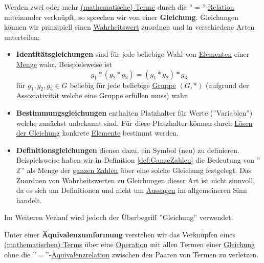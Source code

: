 \documentclass[../../main.tex]{subfiles}
\begin{document}
	\begin{definition}
		\label{def:Gleichung}
		Werden zwei oder mehr \hyperref[def:MathematischerTerm]{(mathematische) Terme} durch die ''$=$''-\hyperref[def:Relation]{Relation} miteinander verknüpft, so sprechen wir von einer \textbf{Gleichung}. Gleichungen können wir prinzipiell einen \hyperref[def:Wahrheitswert]{Wahrheitswert} zuordnen und in verschiedene Arten unterteilen:
		\begin{itemize}
			\item \textbf{Identitätsgleichungen} sind für jede beliebige Wahl von \hyperref[def:Element]{Elementen} einer \hyperref[def:Menge]{Menge} wahr. Beispielsweise ist 
			$$
			g_1 * (g_2 * g_3) = (g_1 * g_2) * g_3
			$$
			für $g_1,g_2,g_3 \in G$ beliebig für jede beliebige \hyperref[def:Gruppe]{Gruppe} $(G,*)$ (aufgrund der \hyperref[def:assoziativ]{Assoziativität} welche eine Gruppe erfüllen muss) wahr.

			\item \textbf{Bestimmungsgleichungen} enthalten Platzhalter für Werte (''Variablen'') welche zunächst unbekannt sind. Für diese Platzhalter können durch \hyperref[def:LösenEinerGleichung]{Lösen der Gleichung} konkrete \hyperref[def:Element]{Elemente} bestimmt werden.
			
			\item \textbf{Definitionsgleichungen} dienen dazu, ein Symbol (neu) zu definieren. Beispielsweise haben wir in Definition \ref{def:GanzeZahlen} die Bedeutung von ''$\mathbb{Z}$'' als Menge der \hyperref[def:GanzeZahlen]{ganzen Zahlen} über eine solche Gleichung festgelegt. Das Zuordnen von Wahrheitswerten zu Gleichungen dieser Art ist nicht sinnvoll, da es sich um Definitionen und nicht um \hyperref[def:Aussage]{Aussagen} im allgemeineren Sinn handelt.
 		\end{itemize}
 		Im Weiteren Verlauf wird jedoch der Überbegriff ''Gleichung'' verwendet. 
	\end{definition}

	\begin{definition}[Äquivalenzumformung]
		\label{def:Äquivalenzumformung}
		Unter einer \textbf{Äquivalenzumformung} verstehen wir das Verknüpfen eines \hyperref[def:MathematischerTerm]{(mathematischen) Terms} über eine \hyperref[def:Operation]{Operation} mit allen Termen einer \hyperref[def:Gleichung]{Gleichung} ohne die ''$=$''-\hyperref[def:Äquivalenzrelation]{Äquivalenzrelation} zwischen den Paaren von Termen zu verletzen.
	\end{definition}
\end{document}
